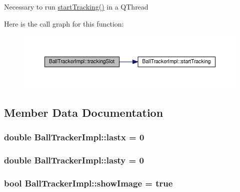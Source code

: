 Necessary to run \hyperlink{class_ball_tracker_impl_adafeb5b7297cc09a42fdcd00aa52b367}{start\+Tracking()} in a Q\+Thread 

Here is the call graph for this function\+:\nopagebreak
\begin{figure}[H]
\begin{center}
\leavevmode
\includegraphics[width=350pt]{class_ball_tracker_impl_a4a66db042c2b4a2f0c2f76c6c9fbfa96_cgraph}
\end{center}
\end{figure}




\subsection{Member Data Documentation}
\subsubsection[{\texorpdfstring{lastx}{lastx}}]{\setlength{\rightskip}{0pt plus 5cm}double Ball\+Tracker\+Impl\+::lastx = 0\hspace{0.3cm}{\ttfamily [protected]}}\hypertarget{class_ball_tracker_impl_a9588e1cae36137cab8f815802f9bbf22}{}\label{class_ball_tracker_impl_a9588e1cae36137cab8f815802f9bbf22}
\subsubsection[{\texorpdfstring{lasty}{lasty}}]{\setlength{\rightskip}{0pt plus 5cm}double Ball\+Tracker\+Impl\+::lasty = 0\hspace{0.3cm}{\ttfamily [protected]}}\hypertarget{class_ball_tracker_impl_a350b9d1e03a2191baed4f33c11c7217e}{}\label{class_ball_tracker_impl_a350b9d1e03a2191baed4f33c11c7217e}
\subsubsection[{\texorpdfstring{show\+Image}{showImage}}]{\setlength{\rightskip}{0pt plus 5cm}bool Ball\+Tracker\+Impl\+::show\+Image = true\hspace{0.3cm}{\ttfamily [protected]}}\hypertarget{class_ball_tracker_impl_ad8ac7539ec3de2bb0657048366677bfa}{}\label{class_ball_tracker_impl_ad8ac7539ec3de2bb0657048366677bfa}


